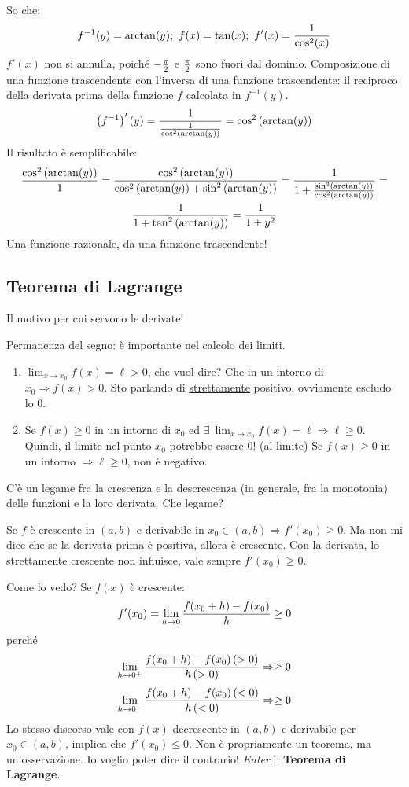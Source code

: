 \documentclass[12pt,a4paper]{article}
\begin{document}
So che:
$$ f^{-1}(y) = \arctan(y) ; \ f(x) = \tan(x) ; \ f'(x) =
{1 \over \cos^{2}(x)} $$
$f'(x)$ non si annulla, poich\'e $-{\pi \over 2}$ e ${\pi \over 2}$ 
sono fuori dal dominio. Composizione di una funzione trascendente 
con l'inversa di una funzione trascendente: il reciproco della derivata 
prima della funzione $f$ calcolata in $f^{-1}(y)$.
$$ \left( f^{-1} \right)'(y) = {1 \over {1 \over \cos^2
 \left( \arctan(y) \right)}} = \cos^2 \left( \arctan(y) \right) $$
Il risultato \`e semplificabile:
\begin{multline}
{\cos^2 \left( \arctan(y) \right) \over 1} = 
{\cos^2 \left( \arctan(y) \right) \over \cos^2 \left( \arctan(y) \right) +
\sin^2 \left( \arctan(y) \right)} =
{1 \over 1 + {\sin^2 \left( \arctan(y) \right) \over
 \cos^2 \left( \arctan(y) \right)}} = \\ 
{1 \over 1 + \tan^2 \left( \arctan(y) \right)} = 
{1 \over 1 + y^2}
\end{multline}
Una funzione razionale, da una funzione trascendente!

\subsection{Teorema di Lagrange}
\label{lagrange}
Il motivo per cui servono le derivate!

Permanenza del segno: \`e importante nel calcolo dei limiti.
\begin{enumerate}
\item   $\lim_{x \to x_0} f(x) = \ell > 0$, che vuol dire? Che 
        in un intorno di $x_0 \Rightarrow f(x) > 0$. Sto parlando
        di \underline{strettamente} positivo, ovviamente escludo lo $0$.
\item   Se $f(x) \geq 0$ in un intorno di $x_0$ ed $ \exists \ 
        \lim_{x \to x_0} f(x) = \ell \Rightarrow \ell \geq 0$. Quindi, il
        limite nel punto $x_0$ potrebbe essere $0$! (\underline{al limite})
        Se $f(x) \geq 0$ in un intorno $\Rightarrow \ell \geq 0$, 
        non \`e negativo.
\end{enumerate}
C'\`e un legame fra la crescenza e la descrescenza (in generale, fra la
monotonia) delle funzioni e la loro derivata. Che legame?

Se $f$ \`e crescente in $(a,b)$ e derivabile in $x_0 \in (a,b) \Rightarrow
f'(x_0) \geq 0$. Ma non mi dice che se la derivata prima \`e positiva,
allora \`e crescente. Con la derivata, lo strettamente crescente non
influisce, vale sempre $f'(x_0) \geq 0$.

Come lo vedo? Se $f(x)$ \`e crescente:
$$ f'(x_0) = \lim_{h \to 0} {f(x_0+h) - f(x_0) \over h} \geq 0 $$
perch\'e
$$ \lim_{h \to 0^+} {f(x_0+h) - f(x_0) \left(> 0\right)
 \over h \left(> 0\right)} \Rightarrow \geq 0 $$
$$ \lim_{h \to 0^-} {f(x_0+h) - f(x_0) \left(< 0\right)
 \over h \left(< 0\right)} \Rightarrow \geq 0 $$
Lo stesso discorso vale con $f(x)$ decrescente in $(a,b)$ e
derivabile per $x_0 \in (a,b)$, implica che $f'(x_0) \leq 0$. 
Non \`e propriamente un teorema, ma un'osservazione. Io voglio poter
dire il contrario! \textit{Enter} il \textbf{Teorema di Lagrange}.
\end{document}
